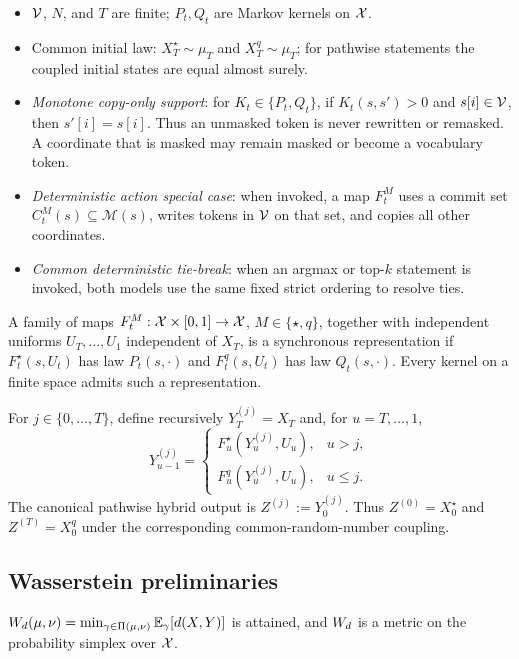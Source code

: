 \begin{itemize}[leftmargin=2.2em,itemsep=1pt]
\item[\textbf{(A1)}] $\mathcal{V}$, $N$, and $T$ are finite; $P_t,Q_t$ are Markov kernels on $\mathcal{X}$.
\item[\textbf{(A2)}] Common initial law: $X_T^\star\sim\mu_T$ and $X_T^q\sim\mu_T$; for
pathwise statements the coupled initial states are equal almost surely.
\item[\textbf{(A3)}] \emph{Monotone copy-only support}: for $K_t\in\{P_t,Q_t\}$, if
$K_t(s,s')>0$ and $s[i]\in\mathcal{V}$, then $s'[i]=s[i]$. Thus an unmasked token is never rewritten or
remasked. A coordinate that is masked may remain masked or become a vocabulary token.
\item[\textbf{(A4)}] \emph{Deterministic action special case}: when invoked, a map $F_t^M$ uses a
commit set $C_t^M(s)\subseteq\mathcal M(s)$, writes tokens in $\mathcal{V}$ on that set, and copies all
other coordinates.
\item[\textbf{(A5)}] \emph{Common deterministic tie-break}: when an argmax or top-$k$ statement is
invoked, both models use the same fixed strict ordering to resolve ties.
\end{itemize}

\begin{definition}
\label{def:app:sync}
A family of maps $F_t^M:\mathcal{X}\times[0,1]\to\mathcal{X}$, $M\in\{\star,q\}$, together with independent
uniforms $U_T,\dots,U_1$ independent of $X_T$, is a synchronous representation if
$F_t^\star(s,U_t)$ has law $P_t(s,\cdot)$ and $F_t^q(s,U_t)$ has law $Q_t(s,\cdot)$. Every kernel
on a finite space admits such a representation.

For $j\in\{0,\dots,T\}$, define recursively $Y_T^{(j)}=X_T$ and, for $u=T,\dots,1$,
\[
Y_{u-1}^{(j)}=
\begin{cases}
F_u^\star(Y_u^{(j)},U_u), & u>j,\\
F_u^q(Y_u^{(j)},U_u), & u\le j.
\end{cases}
\]
The canonical pathwise hybrid output is $Z^{(j)}:=Y_0^{(j)}$. Thus $Z^{(0)}=X_0^\star$ and
$Z^{(T)}=X_0^q$ under the corresponding common-random-number coupling.
\end{definition}

\subsection{Wasserstein preliminaries}
\label{app:proofs:wass}

\begin{lemma}
\label{lem:G:metric}
$W_{d}(\mu,\nu)=\min_{\gamma\in\Pi(\mu,\nu)}\mathbb{E}_{\gamma}[d(X,Y)]$ is attained, and $W_{d}$ is a metric
on the probability simplex over $\mathcal{X}$.
\end{lemma}

